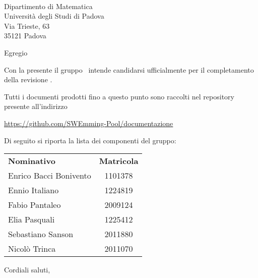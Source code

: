 \documentclass[12pt, boldsubject, italicsignature, noindent]{letteracdp}
\date{}
\begin{document}
\begin{letter}{
        \Vardanega \\
        Dipartimento di Matematica \\
        Università degli Studi di Padova \\
        Via Trieste, 63 \\ 35121 Padova
    }

    \opening{Egregio \vardanega}

    Con la presente il gruppo \groupName\ intende candidarsi ufficialmente per il completamento della revisione \PB.

    Tutti i documenti prodotti fino a questo punto sono raccolti nel repository presente all'indirizzo
    \begin{center}
        \url{https://github.com/SWEmming-Pool/documentazione}
    \end{center}

    Di seguito si riporta la lista dei componenti del gruppo:

    \begin{center}
        \begin{tabular}{l|c}
            \textbf{Nominativo}    & \textbf{Matricola} \\
            Enrico Bacci Bonivento & 1101378            \\
            Ennio Italiano         & 1224819            \\
            Fabio Pantaleo         & 2009124            \\
            Elia Pasquali          & 1225412            \\
            Sebastiano Sanson      & 2011880            \\
            Nicolò Trinca          & 2011070
        \end{tabular}
    \end{center}

    \closing{Cordiali saluti,}

\end{letter}
\end{document}
